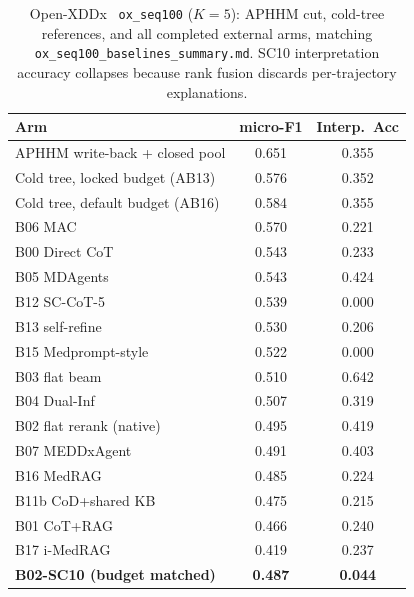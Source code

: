 \begin{table}[t]
\centering
\scriptsize
\caption{Open-XDDx~\cite{dualinf2025} \texttt{ox\_seq100} ($K{=}5$): APHHM cut, cold-tree references, and all completed external arms, matching \texttt{ox\_seq100\_baselines\_summary.md}. SC10 interpretation accuracy collapses because rank fusion discards per-trajectory explanations.}
\label{tab:ox-full}
\begin{tabular}{lcc}
\toprule
Arm & micro-F1 & Interp.\ Acc \\
\midrule
APHHM write-back + closed pool & 0.651 & 0.355 \\
Cold tree, locked budget (AB13) & 0.576 & 0.352 \\
Cold tree, default budget (AB16) & 0.584 & 0.355 \\
\midrule
B06 MAC~\cite{chen2025mac,mac2026} & 0.570 & 0.221 \\
B00 Direct CoT & 0.543 & 0.233 \\
B05 MDAgents~\cite{mdagents} & 0.543 & 0.424 \\
B12 SC-CoT-5~\cite{wang2023selfconsistency} & 0.539 & 0.000 \\
B13 self-refine~\cite{madaan2023selfrefine} & 0.530 & 0.206 \\
B15 Medprompt-style~\cite{medprompt} & 0.522 & 0.000 \\
B03 flat beam & 0.510 & 0.642 \\
B04 Dual-Inf~\cite{dualinf2025} & 0.507 & 0.319 \\
B02 flat rerank (native) & 0.495 & 0.419 \\
B07 MEDDxAgent~\cite{meddxagent2025} & 0.491 & 0.403 \\
B16 MedRAG~\cite{medrag,xiong2024medrag} & 0.485 & 0.224 \\
B11b CoD+shared KB~\cite{chainofdiagnosis} & 0.475 & 0.215 \\
B01 CoT+RAG & 0.466 & 0.240 \\
B17 i-MedRAG~\cite{imedrag} & 0.419 & 0.237 \\
\midrule
\textbf{B02-SC10 (budget matched)} & \textbf{0.487} & \textbf{0.044} \\
\bottomrule
\end{tabular}
\end{table}

